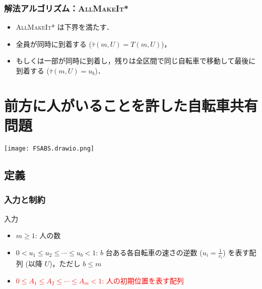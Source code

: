 \documentclass[dvipdfmx,12pt]{beamer}
\newcommand{\definedas}{:}
\begin{document}
\begin{frame}
  \frametitle{解法アルゴリズム：\textsc{AllMakeIt*}}
  \begin{itemize}
  \item \textsc{AllMakeIt*} は下界を満たす．
  \item<2-> 全員が同時に到着する ($\bar\tau(m, U) = T(m, U)$)，
  \item<3-> もしくは一部が同時に到着し，残りは全区間で同じ自転車で移動して最後に到着する ($\bar\tau(m, U) = u_b$)．
  \end{itemize}
\end{frame}

\section{前方に人がいることを許した自転車共有問題}
\begin{frame}
  \centering\texttt{[image: FSABS.drawio.png]}
\end{frame}

\subsection{定義}
\begin{frame}
  \frametitle{入力と制約}
  \begin{block}{入力}
    \begin{itemize}
    \item $m \geq 1$\definedas{} 人の数
    \item $0 < u_1 \leq u_2 \leq \cdots \leq u_b < 1 $\definedas{} $b$ 台ある各自転車の速さの逆数 ($u_i = \frac{1}{v_i}$) を表す配列 (以降 $U$)，ただし $b \leq m$
    \item \textcolor{red}{$0 \leq A_1 \leq A_2 \leq \cdots \leq A_m < 1$\definedas{} 人の初期位置を表す配列}
    \end{itemize}
  \end{block}
\end{frame}
\end{document}
